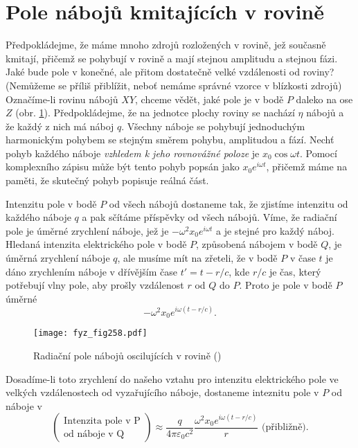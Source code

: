 {  \section{Pole nábojů kmitajících v rovině}\label{fyz:IchapXXXsecVII}
    Předpokládejme, že máme mnoho zdrojů rozložených v rovině, jež současně kmitají, přičemž se 
    pohybují v rovině a mají stejnou amplitudu a stejnou fázi. Jaké bude pole v konečné, ale přitom 
    dostatečně velké vzdálenosti od roviny? (Nemůžeme se příliš přiblížit, neboť nemáme správné 
    vzorce v blízkosti zdrojů) Označíme-li rovinu nábojů \(XY\), chceme vědět, jaké pole je v bodě 
    \(P\) daleko na ose \(Z\) (obr. \ref{fyz:fig258}). Předpokládejme, že na jednotce plochy roviny 
    se nachází \(\eta\) nábojů a že každý z nich má náboj \(q\). Všechny náboje se pohybují 
    jednoduchým harmonickým pohybem se stejným směrem pohybu, amplitudou a fází. Nechť pohyb 
    každého náboje \emph{vzhledem k jeho rovnovážné poloze} je \(x_0\cos\omega t\). Pomocí 
    komplexního zápisu může být tento pohyb popsán jako \(x_0e^{i\omega t}\), přičemž máme na 
    paměti, že skutečný pohyb popisuje reálná část. 
    
    Intenzitu pole v bodě \(P\) od všech nábojů dostaneme tak, že zjistíme intenzitu od každého 
    náboje \(q\) a pak sčítáme příspěvky od všech nábojů. Víme, že radiační pole je úměrné 
    zrychlení náboje, jež je \(-\omega^2x_0e^{i\omega t}\) a je stejné pro každý náboj. Hledaná 
    intenzita elektrického pole v bodě \(P\), způsobená nábojem v bodě \(Q\), je úměrná zrychlení 
    náboje \(q\), ale musíme mít na zřeteli, že v bodě \(P\) v čase \(t\) je dáno zrychlením náboje 
    v dřívějším čase \(t' = t - r/c\), kde \(r/c\) je čas, který potřebují vlny pole, aby prošly 
    vzdálenost \(r\) od \(Q\) do \(P\). Proto je pole v bodě \(P\) úměrné
    \begin{equation}\label{fyz:eq327}
      - \omega^2x_0e^{i\omega(t-r/c)}.
    \end{equation}
    
    \begin{figure}[ht!] %
      \centering
      \texttt{[image: fyz\_fig258.pdf]}
      \caption{Radiační pole nábojů oscilujících v rovině
               (\cite[s.~404]{Feynman01})}
      \label{fyz:fig258}
    \end{figure}
    
    Dosadíme-li toto zrychlení do našeho vztahu pro intenzitu elektrického pole ve velkých  
    vzdálenostech od vyzařujícího náboje, dostaneme inteznitu pole v \(P\) od náboje v 
    \begin{equation*}
      \left(\begin{matrix}
         \text{Intenzita pole v P}  \\
         \text{od náboje v Q}
      \end{matrix}\right) \approx 
      \frac{q}{4\pi\varepsilon_0c^2}
      \frac{\omega^2x_0e^{i\omega(t-r/c)}}{r}\text{ (přibližně)}.
    \end{equation*}
    
}
